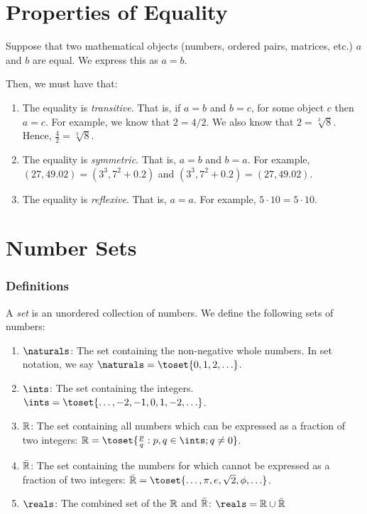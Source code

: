 \documentclass[../proofs.tex]{subfiles}
\begin{document}
\section{Properties of Equality}
  Suppose that two mathematical objects (numbers, ordered pairs, matrices, etc.)
  $a$ and $b$ are equal. We express this as $a = b$.

  Then, we must have that:
  \begin{enumerate}[label=(\alph*)]
    \item The equality is \emph{transitive}. That is, if $a = b$ and $b = c$,
    for some object $c$ then $a = c$. For example, we know that $2 = 4/2$. We
    also know that $2 = \sqrt[3]{8}$. Hence, $\frac{4}{2} = \sqrt[3]{8}$.

    \item The equality is \emph{symmetric}. That is, $a = b$ and $b = a$.
    For example, $(27, 49.02) = (3^3, 7^2 + 0.2)$ and
    $(3^3, 7^2 + 0.2) = (27, 49.02)$.

    \item The equality is \emph{reflexive}. That is, $a = a$. For example,
     $5 \cdot 10 = 5 \cdot 10.$
  \end{enumerate}

\section{Number Sets}
  \subsubsection*{Definitions}
  A \emph{set} is an unordered collection of numbers. We define the following
  sets of numbers:
  \begin{enumerate}
    \item $\naturals$: The set containing the non-negative whole numbers. In
    set notation, we say $\naturals = \toset{0, 1, 2, \ldots}$.

    \item $\ints$: The set containing the integers. $\ints = \toset{\ldots, -2,
    -1, 0, 1, -2, \ldots}$.

    \item $\mathbb{R}$: The set containing all numbers which can be expressed as
    a fraction of two integers:
    $\rationals = \toset{\frac{p}{q}: p, q \in \ints; q \neq 0}$.

    \item $\bar{\mathbb{R}}$: The set containing the numbers for which cannot
    be expressed as a fraction of two integers:
    $\bar{\rationals} = \toset{\ldots, \pi, e, \sqrt{2}, \phi, \ldots}$.

    \item $\reals$: The combined set of the $\mathbb{R}$ and $\bar{\mathbb{R}}$:
    $\reals = \rationals \cup \bar{\rationals}$
  \end{enumerate}
\end{document}
